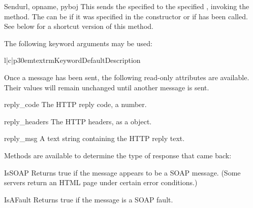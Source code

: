 \begin{methoddesc}{Send}{url, opname, pyboj}
This sends the specified  to the specified , invoking
the  method.
The  can be  if it was specified in the 
constructor or if  has been called.
See below for a shortcut version of this method.

The following keyword arguments may be used:

\begin{tableiii}{l|c|p{30em}}{textrm}{Keyword}{Default}{Description}
\end{tableiii}

\end{methoddesc}

Once a message has been sent, the following read-only attributes are
available.
Their values will remain unchanged until another message is sent.

\begin{memberdesc}{reply_code}
The HTTP reply code, a number.
\end{memberdesc}

\begin{memberdesc}{reply_headers}
The HTTP headers, as a  object.
\end{memberdesc}

\begin{memberdesc}{reply_msg}
A text string containing the HTTP reply text.
\end{memberdesc}

Methods are available to determine the type of response that came back:

\begin{methoddesc}{IsSOAP}{}
Returns true if the message appears to be a SOAP message.
(Some servers return an HTML page under certain error conditions.)
\end{methoddesc}

\begin{methoddesc}{IsAFault}{}
Returns true if the message is a SOAP fault.
\end{methoddesc}

